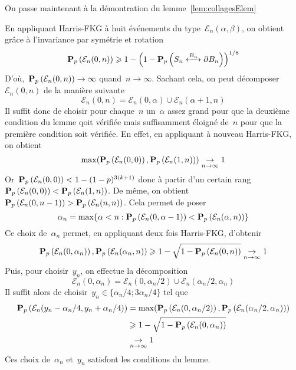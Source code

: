 		On passe maintenant à la démontration du lemme~\ref{lem:collagesElem}
		\begin{dem}
			En appliquant Harris-FKG à huit événements du type~$\mathcal{E}_n(\alpha, \beta)$, on obtient grâce à l'invariance par symétrie et rotation
			\[
				\Pp{\mathcal{E}_n(0,n)} \geq 1 - \left(1 - \Pp{\relie[B_n]{S_n}{\partial B_n}} \right)^{1/8}
			\]
			D'où,~$\bm{\mathrm{P}}_{p}\left(\mathcal{E}_n(0, n)\right) \to \infty$ quand~$n \to \infty$. Sachant cela, on peut décomposer~$\mathcal{E}_n(0, n)$ de la manière suivante
			\[
				\mathcal{E}_n(0, n) = \mathcal{E}_n(0, \alpha) \cup \mathcal{E}_n(\alpha + 1, n)
			\]
			Il suffit donc de choisir pour chaque~$n$ un~$\alpha$ assez grand pour que la deuxième condition du lemme qoit vérifiée mais suffisamment éloigné de~$n$ pour que la première condition soit vérifiée. En effet, en appliquant à nouveau Harris-FKG, on obtient
			\[
				\max(\bm{\mathrm{P}}_{p}\left(\mathcal{E}_n(0, 0)\right), \bm{\mathrm{P}}_{p}\left(\mathcal{E}_n(1, n)\right)) \underset{n \to \infty}{\to} 1
			\]
			Or~$\bm{\mathrm{P}}_{p}\left(\mathcal{E}_n(0,0)\right) < 1 - (1-p)^{3(k+1)}$ donc à partir d'un certain rang~$\bm{\mathrm{P}}_{p}\left(\mathcal{E}_n(0,0)\right) < \bm{\mathrm{P}}_{p}\left(\mathcal{E}_n(1, n)\right)$. De même, on obtient~$\bm{\mathrm{P}}_{p}\left(\mathcal{E}_n(0, n-1)\right) > \bm{\mathrm{P}}_{p}\left(\mathcal{E}_n(n, n)\right)$. Cela permet de poser 
			\[
				\alpha_n = \max \{ \alpha < n : \bm{\mathrm{P}}_{p}\left(\mathcal{E}_n(0, \alpha - 1)\right) < \bm{\mathrm{P}}_{p}\left(\mathcal{E}_n(\alpha, n)\right) \}
			\]
			Ce choix de~$\alpha_n$ permet, en appliquant deux fois Harris-FKG, d'obtenir
			\[
				\bm{\mathrm{P}}_{p}\left(\mathcal{E}_n(0, \alpha_n)\right), \bm{\mathrm{P}}_{p}\left(\mathcal{E}_n(\alpha_n, n)\right) \geqslant 1 - \sqrt{1  - \bm{\mathrm{P}}_{p}\left(\mathcal{E}_n(0, n)\right)} \underset{n \to \infty}{\to} 1
			\]
			Puis, pour choisir~$y_n$, on effectue la décomposition
			\[
				\mathcal{E}_n(0, \alpha_n) = \mathcal{E}_n(0, \alpha_n/2) \cup \mathcal{E}_n(\alpha_n/2, \alpha_n)
			\]
			Il suffit alors de choisir~$y_n \in \{ \alpha_n/4 ; 3\alpha_n/4 \}$ tel que
			\begin{align*}
				\bm{\mathrm{P}}_{p}\left(\mathcal{E}_n(y_n - \alpha_n/4, y_n + \alpha_n/4)\right) 
					& = \max(\bm{\mathrm{P}}_{p}\left(\mathcal{E}_n(0, \alpha_n/2)\right), \bm{\mathrm{P}}_{p}\left(\mathcal{E}_n(\alpha_n/2, \alpha_n)\right)) \\
				       	& \geqslant 1 - \sqrt{1 - \bm{\mathrm{P}}_{p}\left(\mathcal{E}_n(0, \alpha_n)\right)} \\ 
					& \underset{n \to \infty}{\to} 1
			\end{align*}
			Ces choix de~$\alpha_n$ et~$y_n$ satisfont les conditions du lemme.
		\end{dem}


